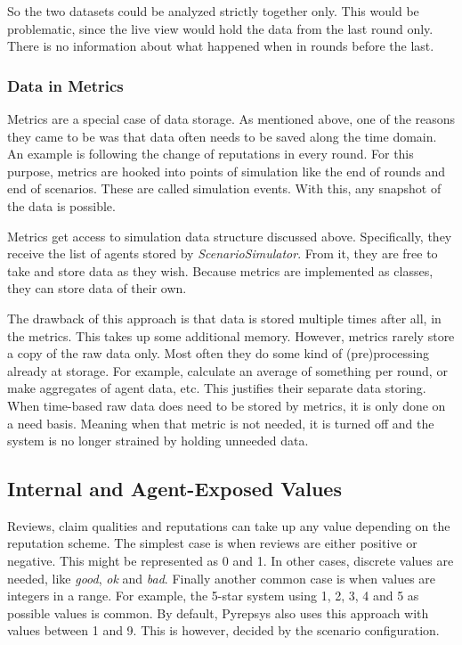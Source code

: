 \documentclass[%
    ]{\PathToTumTemplate/thesis/tum_thesis}
\begin{document}
So the two datasets could be analyzed strictly together only.
This would be problematic, since the live view would hold the data from the last round only.
There is no information about what happened when in rounds before the last.

\subsubsection{Data in Metrics}
Metrics are a special case of data storage.
As mentioned above, one of the reasons they came to be was that data often needs to be saved along the time domain.
An example is following the change of reputations in every round.
For this purpose, metrics are hooked into points of simulation like the end of rounds and end of scenarios.
These are called simulation events.
With this, any snapshot of the data is possible.

Metrics get access to simulation data structure discussed above.
Specifically, they receive the list of agents stored by \emph{ScenarioSimulator}.
From it, they are free to take and store data as they wish.
Because metrics are implemented as classes, they can store data of their own.

The drawback of this approach is that data is stored multiple times after all, in the metrics.
This takes up some additional memory.
However, metrics rarely store a copy of the raw data only.
Most often they do some kind of (pre)processing already at storage.
For example, calculate an average of something per round, or make aggregates of agent data, etc.
This justifies their separate data storing.
When time-based raw data does need to be stored by metrics, it is only done on a need basis.
Meaning when that metric is not needed, it is turned off and the system is no longer strained by holding unneeded data.


\subsection{Internal and Agent-Exposed Values}\label{sec:i_ae_reprepentation}
Reviews, claim qualities and reputations can take up any value depending on the reputation scheme.
The simplest case is when reviews are either positive or negative.
This might be represented as 0 and 1.
In other cases, discrete values are needed, like \emph{good}, \emph{ok} and \emph{bad}.
Finally another common case is when values are integers in a range.
For example, the 5-star system using 1, 2, 3, 4 and 5 as possible values is common.
By default, Pyrepsys also uses this approach with values between 1 and 9.
This is however, decided by the scenario configuration.
\end{document}

